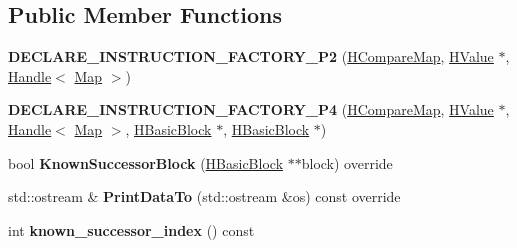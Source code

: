 \subsection*{Public Member Functions}
\begin{DoxyCompactItemize}
\item 
{\bfseries D\+E\+C\+L\+A\+R\+E\+\_\+\+I\+N\+S\+T\+R\+U\+C\+T\+I\+O\+N\+\_\+\+F\+A\+C\+T\+O\+R\+Y\+\_\+\+P2} (\hyperlink{classv8_1_1internal_1_1_h_compare_map}{H\+Compare\+Map}, \hyperlink{classv8_1_1internal_1_1_h_value}{H\+Value} $\ast$, \hyperlink{classv8_1_1internal_1_1_handle}{Handle}$<$ \hyperlink{classv8_1_1internal_1_1_map}{Map} $>$)\hypertarget{classv8_1_1internal_1_1_h_compare_map_abb4b5b2ba279323d34a38a12ae03cd90}{}\label{classv8_1_1internal_1_1_h_compare_map_abb4b5b2ba279323d34a38a12ae03cd90}

\item 
{\bfseries D\+E\+C\+L\+A\+R\+E\+\_\+\+I\+N\+S\+T\+R\+U\+C\+T\+I\+O\+N\+\_\+\+F\+A\+C\+T\+O\+R\+Y\+\_\+\+P4} (\hyperlink{classv8_1_1internal_1_1_h_compare_map}{H\+Compare\+Map}, \hyperlink{classv8_1_1internal_1_1_h_value}{H\+Value} $\ast$, \hyperlink{classv8_1_1internal_1_1_handle}{Handle}$<$ \hyperlink{classv8_1_1internal_1_1_map}{Map} $>$, \hyperlink{classv8_1_1internal_1_1_h_basic_block}{H\+Basic\+Block} $\ast$, \hyperlink{classv8_1_1internal_1_1_h_basic_block}{H\+Basic\+Block} $\ast$)\hypertarget{classv8_1_1internal_1_1_h_compare_map_abe04fcd7be73d076050c7fe4d8a15dca}{}\label{classv8_1_1internal_1_1_h_compare_map_abe04fcd7be73d076050c7fe4d8a15dca}

\item 
bool {\bfseries Known\+Successor\+Block} (\hyperlink{classv8_1_1internal_1_1_h_basic_block}{H\+Basic\+Block} $\ast$$\ast$block) override\hypertarget{classv8_1_1internal_1_1_h_compare_map_a214a7f2e8b4322eec013fc3b3aa6c32f}{}\label{classv8_1_1internal_1_1_h_compare_map_a214a7f2e8b4322eec013fc3b3aa6c32f}

\item 
std\+::ostream \& {\bfseries Print\+Data\+To} (std\+::ostream \&os) const  override\hypertarget{classv8_1_1internal_1_1_h_compare_map_af81ca9cd7d1a2ef8e3e9a26021b5716e}{}\label{classv8_1_1internal_1_1_h_compare_map_af81ca9cd7d1a2ef8e3e9a26021b5716e}

\item 
int {\bfseries known\+\_\+successor\+\_\+index} () const \hypertarget{classv8_1_1internal_1_1_h_compare_map_adb240579b229f847def8300d19d674d0}{}\label{classv8_1_1internal_1_1_h_compare_map_adb240579b229f847def8300d19d674d0}


\end{DoxyCompactItemize}
